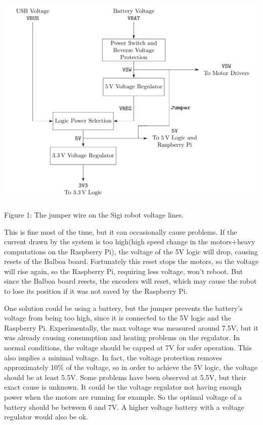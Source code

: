 \documentclass{article}
\begin{document}
\begin{center}
        
        
        \includegraphics{img/power.png}

        Figure 1: The jumper wire on the Sigi robot voltage lines.

\end{center}

This is fine most of the time, but it can occasionally cause problems.
If the current drawn by the system is too high(high speed change in the motors+heavy 
computations on the Raspberry Pi), the voltage of the 5V logic will drop, causing
resets of the Balboa board. Fortunately this reset stops the motors, so the voltage will rise
again, so the Raspberry Pi, requiring less voltage, won't reboot. But since the Balboa board
resets, the encoders will reset, which may cause the robot to lose its position if it was not
saved by the Raspberry Pi.

One solution could be using a battery, but the jumper prevents the battery's voltage from being
too high, since it is connected to the 5V logic and the Raspberry Pi. Experimentally, the max
voltage was measured around 7.5V, but it was already causing consumption and heating problems on
the regulator. In normal conditions, the voltage should be capped at 7V for safer operation.
This also implies a minimal voltage. In fact, the voltage protection removes approximately 10\%
of the voltage, so in order to achieve the 5V logic, the voltage should be at least 5.5V.
Some problems have been observed at 5.5V, but their exact cause is unknown. It could be the
voltage regulator not having enough power when the motors are running for example.
So the optimal voltage of a battery should be between 6 and 7V. A higher voltage battery
with a voltage regulator would also be ok.
\end{document}
